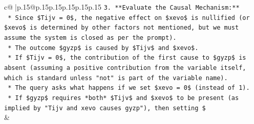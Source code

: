 \documentclass{article}
\begin{document}
{\begin{supertabular}{c@{$\;$}|p{.15\linewidth}@{}p{.15\linewidth}p{.15\linewidth}p{.15\linewidth}p{.15\linewidth}p{.15\linewidth}}
{{{\texttt{3.  **Evaluate the Causal Mechanism:**} \\
\texttt{    *   Since \$Tijv = 0\$, the negative effect on \$xevo\$ is nullified (or \$xevo\$ is determined by other factors not mentioned, but we must assume the system is closed as per the prompt).} \\
\texttt{    *   The outcome \$gyzp\$ is caused by \$Tijv\$ and \$xevo\$.} \\
\texttt{    *   If \$Tijv = 0\$, the contribution of the first cause to \$gyzp\$ is absent (assuming a positive contribution from the variable itself, which is standard unless "not" is part of the variable name).} \\
\texttt{    *   The query asks what happens if we set \$xevo = 0\$ (instead of 1).} \\
\texttt{    *   If \$gyzp\$ requires *both* \$Tijv\$ and \$xevo\$ to be present (as implied by "Tijv and xevo causes gyzp"), then setting \$} \\
            }
        }
    }
    & \\ \\


\end{supertabular}}
\end{document}
